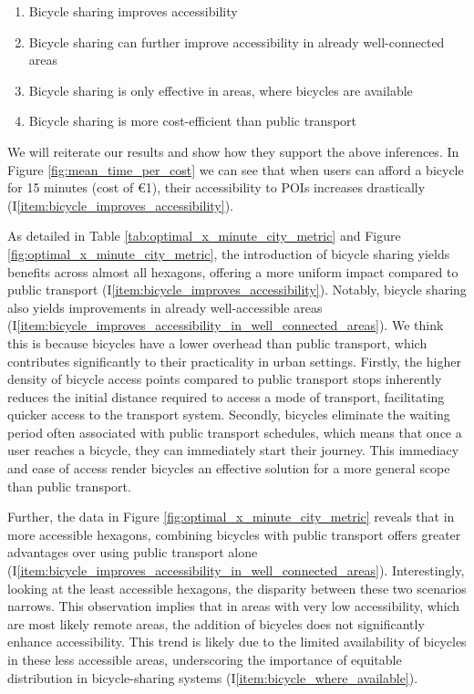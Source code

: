 \begin{enumerate}
  \renewcommand{\labelenumi}{I\theenumi.}
  \item Bicycle sharing improves accessibility \label{item:bicycle_improves_accessibility}
  \item Bicycle sharing can further improve accessibility in already well-connected areas \label{item:bicycle_improves_accessibility_in_well_connected_areas}
  \item Bicycle sharing is only effective in areas, where bicycles are available \label{item:bicycle_where_available}
  \item Bicycle sharing is more cost-efficient than public transport \label{item:bicycle_more_cost_efficient_than_pt}
\end{enumerate}

We will reiterate our results and show how they support the above inferences.
In Figure \ref{fig:mean_time_per_cost} we can see that when users can afford a bicycle for 15 minutes (cost of \euro{1}), their accessibility to POIs increases drastically (I\ref{item:bicycle_improves_accessibility}).

As detailed in Table \ref{tab:optimal_x_minute_city_metric} and Figure \ref{fig:optimal_x_minute_city_metric}, the introduction of bicycle sharing yields benefits across almost all hexagons, offering a more uniform impact compared to public transport (I\ref{item:bicycle_improves_accessibility}).
Notably, bicycle sharing also yields improvements in already well-accessible areas (I\ref{item:bicycle_improves_accessibility_in_well_connected_areas}).
We think this is because bicycles have a lower overhead than public transport, which contributes significantly to their practicality in urban settings.
Firstly, the higher density of bicycle access points compared to public transport stops inherently reduces the initial distance required to access a mode of transport, facilitating quicker access to the transport system. 
Secondly, bicycles eliminate the waiting period often associated with public transport schedules, which means that once a user reaches a bicycle, they can immediately start their journey. 
This immediacy and ease of access render bicycles an effective solution for a more general scope than public transport.

Further, the data in Figure \ref{fig:optimal_x_minute_city_metric} reveals that in more accessible hexagons, combining bicycles with public transport offers greater advantages over using public transport alone (I\ref{item:bicycle_improves_accessibility_in_well_connected_areas}).
Interestingly, looking at the least accessible hexagons, the disparity between these two scenarios narrows. 
This observation implies that in areas with very low accessibility, which are most likely remote areas, the addition of bicycles does not significantly enhance accessibility.
This trend is likely due to the limited availability of bicycles in these less accessible areas, underscoring the importance of equitable distribution in bicycle-sharing systems (I\ref{item:bicycle_where_available}).

